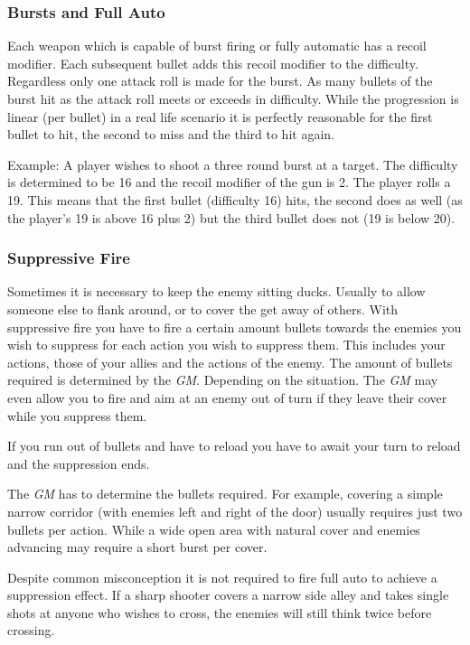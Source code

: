 \subsubsection{Bursts and Full Auto}

Each weapon which is capable of burst firing or fully automatic has a recoil
modifier. Each subsequent bullet adds this recoil modifier to the difficulty.
Regardless only one attack roll is made for the burst. As many bullets of the
burst hit as the attack roll meets or exceeds in difficulty. While the
progression is linear (per bullet) in a real life scenario it is perfectly
reasonable for the first bullet to hit, the second to miss and the third to
hit again.

Example: A player wishes to shoot a three round burst at a target. The
difficulty is determined to be 16 and the recoil modifier of the gun is 2.
The player rolls a 19. This means that the first bullet (difficulty 16) hits,
the second does as well (as the player's 19 is above 16 plus 2) but the third
bullet does not (19 is below 20).

\subsubsection{Suppressive Fire}

Sometimes it is necessary to keep the enemy sitting ducks. Usually to allow
someone else to flank around, or to cover the get away of others. With
suppressive fire you have to fire a certain amount bullets towards the
enemies you wish to suppress for each action you wish to suppress them. This
includes your actions, those of your allies and the actions of the enemy. The
amount of bullets required is determined by the \emph{GM}. Depending on the
situation. The \emph{GM} may even allow you to fire and aim at an enemy out of
turn if they leave their cover while you suppress them.

If you run out of bullets and have to reload you have to await your turn to
reload and the suppression ends.

The \emph{GM} has to determine the bullets required. For example, covering a
simple narrow corridor (with enemies left and right of the door) usually
requires just two bullets per action. While a wide open area with natural
cover and enemies advancing may require a short burst per cover.

Despite common misconception it is not required to fire full auto to achieve
a suppression effect. If a sharp shooter covers a narrow side alley and takes
single shots at anyone who wishes to cross, the enemies will still think twice
before crossing.

